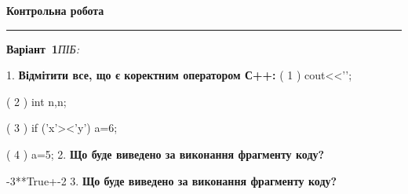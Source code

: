 \documentclass[11pt]{article}
\begin{document}
{\centering\Large\bfseries Контрольна робота\par}
\medskip
\noindent\rule{\linewidth}{0.5pt}
\smallskip
\noindent\textbf{Варіант \No\,1}\hfill \textit{ПІБ:}\,\underline{\hspace{60mm}}
\vspace{4mm}

1. %
\textbf{Відмітити все, що є коректним оператором С++:}
( 1 ) cout<<'\n';

( 2 ) int n,n;

( 3 ) if ('x'><'y') a=6;

( 4 ) {a=5;}
\vspace{5mm}
2. \textbf{Що буде виведено за виконання фрагменту коду?}

-3**True+-2
\vspace{5mm}
3. \textbf{Що буде виведено за виконання фрагменту коду?}
\end{document}

